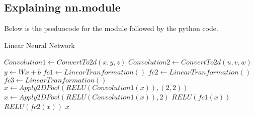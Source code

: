 \documentclass{article}
\begin{document}
\begin{lstlisting}
\end{lstlisting}




\subsection{Explaining nn.module}
Below is the pseduocode for the module followed by the python code.
\begin{algorithm}
\caption{Linear Neural Network}
\begin{algorithmic}[1]
\STATE $Convolution1 \leftarrow ConvertTo2d(x,y,z)$
\STATE $Convolution2 \leftarrow ConvertTo2d(u,v,w)$
\STATE $y \leftarrow Wx + b$
\STATE $fc1 \leftarrow LinearTranformation()$ 
\STATE $fc2 \leftarrow LinearTranformation()$
\STATE $fc3 \leftarrow LinearTranformation()$
\STATE $x \leftarrow Apply2DPool(RELU(Convolution1(x)), (2, 2))$
\STATE $x \leftarrow Apply2DPool(RELU(Convolution1(x)),2 )$
\STATE $RELU(fc1(x))$
\STATE $RELU(fc2(x))$
\RETURN $x$
\end{algorithmic}
\end{algorithm}
\end{document}
